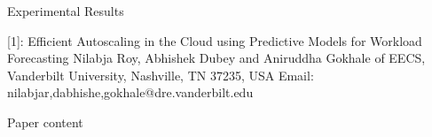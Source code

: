 Experimental Results









[1]: Efficient Autoscaling in the Cloud using Predictive Models for Workload Forecasting
Nilabja Roy, Abhishek Dubey and Aniruddha Gokhale
 of EECS, Vanderbilt University, Nashville, TN 37235, USA
Email: {nilabjar,dabhishe,gokhale}@dre.vanderbilt.edu














Paper content

